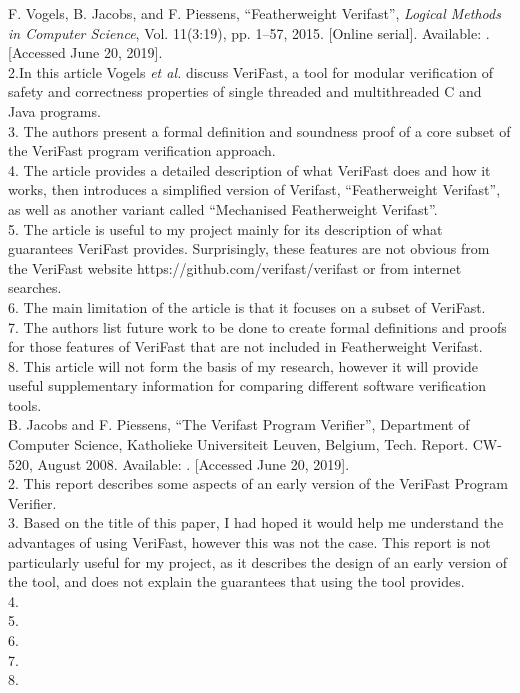 \documentclass[12pt,openany,a4paper]{book}
\begin{document}
\begin{thebibliography}{99}
 F. Vogels, B. Jacobs, and F. Piessens, ``Featherweight Verifast'', \emph{Logical Methods in Computer Science}, Vol. 11(3:19), pp. 1–57, 2015. [Online serial]. Available: \href{https://lmcs.episciences.org/1595}{}. [Accessed June 20, 2019]. \\
2.In this article Vogels \textit{et al.} discuss VeriFast, a tool for modular verification of safety and correctness properties of single threaded and multithreaded C and Java programs. \\
3. The authors present a formal definition and soundness proof of a core subset of the VeriFast program verification approach. \\
4. The article provides a detailed description of what VeriFast does and how it works, then introduces a simplified version of Verifast, ``Featherweight Verifast'', as well as another variant called ``Mechanised Featherweight Verifast''. \\
5. The article is useful to my project mainly for its description of what guarantees VeriFast provides. Surprisingly, these features are not obvious from the VeriFast website https://github.com/verifast/verifast or from internet searches. \\
6. The main limitation of the article is that it focuses on a subset of VeriFast. \\
7. The authors list future work to be done to create formal definitions and proofs for those features of VeriFast that are not included in Featherweight Verifast. \\
8. This article will not form the basis of my research, however it will provide useful supplementary information for comparing different software verification tools. \\

 B. Jacobs and F. Piessens, ``The Verifast Program Verifier'', Department of Computer Science, Katholieke Universiteit Leuven, Belgium, Tech. Report. CW-520, August 2008. Available: \href{https://people.cs.kuleuven.be/~bart.jacobs/verifast/verifast.pdf}{}. [Accessed June 20, 2019]. \\
2. This report describes some aspects of an early version of the VeriFast Program Verifier.\\
3. Based on the title of this paper, I had hoped it would help me understand the advantages of using VeriFast, however this was not the case.  This report is not particularly useful for my  project, as it describes the design of an early version of the tool, and does not explain the guarantees that using the tool provides.\\
4. \\
5.  \\
6. \\
7. \\
8. \\


\end{thebibliography}
\end{document}
